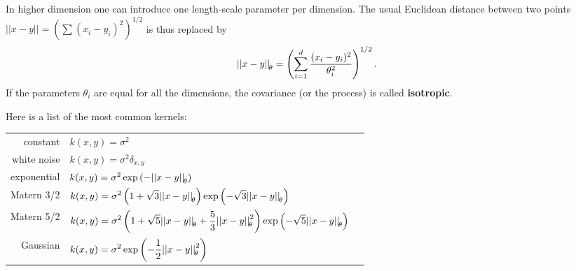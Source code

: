 \begin{frame}{}
In higher dimension one can introduce one length-scale parameter per dimension. The usual Euclidean distance between two points $|| x-y || = ( \sum (x_i-y_i)^2)^{1/2}$ is thus replaced by
\begin{equation*}
	{|| x-y ||}_{\! \theta} = \left( \sum_{i=1}^d \frac{(x_i-y_i)^2}{\theta_i^2} \right)^{1/2}.
\end{equation*}
If the parameters $\theta_i$ are equal for all the dimensions, the covariance (or the process) is called \textbf{isotropic}.
\end{frame}

\begin{frame}{}
Here is a list of the most common kernels:\\
\vspace{2mm}
\footnotesize
\centering
\begin{tabular}{rlN}
		constant & $ \displaystyle k(x,y) = \sigma^2 $ &\\[4mm]
		white noise & $ \displaystyle k(x,y) = \sigma^2 \delta_{x,y} $ &\\[4mm]
		exponential & $\displaystyle k(x,y) = \sigma^2 \exp \left(- {|| x-y ||}_{\! \theta} \right)$ &\\[4mm]
		Matern 3/2 & $\displaystyle k(x,y) = \sigma^2 \left(1 + \sqrt{3}{|| x-y ||}_{\! \theta} \right) \exp \left(- \sqrt{3}{|| x-y ||}_{\! \theta}  \right)$ &\\[4mm]
		Matern 5/2 & $\displaystyle k(x,y) = \sigma^2 \left(1 + \sqrt{5}{|| x-y ||}_{\! \theta} + \frac{5}{3}{|| x-y ||}_{\! \theta}^2 \right) \exp \left(- \sqrt{5}{|| x-y ||}_{\! \theta} \right)$ &\\[4mm]
		Gaussian & $\displaystyle k(x,y) = \sigma^2 \exp \left(- \frac12 {|| x-y ||}_{\! \theta}^2 \right)$ &\\[4mm]
\end{tabular}
\end{frame}


